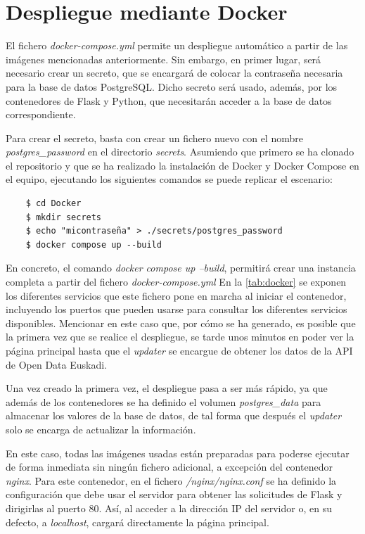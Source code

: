 \documentclass{report}
\begin{document}
        \section{Despliegue mediante Docker}

        El fichero \textit{docker-compose.yml} permite un despliegue automático a partir de las imágenes mencionadas anteriormente. Sin embargo, en primer lugar, será necesario crear un secreto, que se encargará de colocar la contraseña necesaria para la base de datos PostgreSQL. Dicho secreto será usado, además, por los contenedores de Flask y Python, que necesitarán acceder a la base de datos correspondiente.

        Para crear el secreto, basta con crear un fichero nuevo con el nombre \textit{postgres\_password} en el directorio \textit{secrets}. Asumiendo que primero se ha clonado el repositorio y que se ha realizado la instalación de Docker y Docker Compose en el equipo, ejecutando los siguientes comandos se puede replicar el escenario:

        \begin{verbatim}
    $ cd Docker
    $ mkdir secrets
    $ echo "micontraseña" > ./secrets/postgres_password
    $ docker compose up --build
        \end{verbatim}

        En concreto, el comando \textit{docker compose up --build}, permitirá crear una instancia completa a partir del fichero \textit{docker-compose.yml} En la \autoref{tab:docker} se exponen los diferentes servicios que este fichero pone en marcha al iniciar el contenedor, incluyendo los puertos que pueden usarse para consultar los diferentes servicios disponibles. Mencionar en este caso que, por cómo se ha generado, es posible que la primera vez que se realice el despliegue, se tarde unos minutos en poder ver la página principal hasta que el \textit{updater} se encargue de obtener los datos de la API de Open Data Euskadi.

        Una vez creado la primera vez, el despliegue pasa a ser más rápido, ya que además de los contenedores se ha definido el volumen \textit{postgres\_data} para almacenar los valores de la base de datos, de tal forma que después el \textit{updater} solo se encarga de actualizar la información.

        En este caso, todas las imágenes usadas están preparadas para poderse ejecutar de forma inmediata sin ningún fichero adicional, a excepción del contenedor \textit{nginx}. Para este contenedor, en el fichero \textit{/nginx/nginx.conf} se ha definido la configuración que debe usar el servidor para obtener las solicitudes de Flask y dirigirlas al puerto 80. Así, al acceder a la dirección IP del servidor o, en su defecto, a \textit{localhost}, cargará directamente la página principal.
\end{document}
